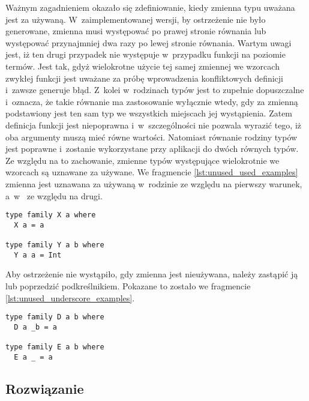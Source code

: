 Ważnym zagadnieniem okazało się zdefiniowanie, kiedy zmienna typu uważana jest
za używaną. W~zaimplementowanej wersji, by ostrzeżenie nie było generowane,
zmienna musi występować po prawej stronie równania lub występować przynajmniej
dwa razy po lewej stronie równania. Wartym uwagi jest, iż ten drugi przypadek
nie występuje w~przypadku funkcji na poziomie termów. Jest tak, gdyż wielokrotne
użycie tej samej zmiennej we wzorcach zwykłej funkcji jest uważane za
próbę wprowadzenia konfliktowych definicji i~zawsze generuje błąd.
Z~kolei w~rodzinach typów jest to zupełnie dopuszczalne i~oznacza, że takie
równanie ma zastosowanie wyłącznie wtedy, gdy za zmienną podstawiony jest ten sam
typ we wszystkich miejscach jej wystąpienia. Zatem definicja funkcji 
jest niepoprawna i~w~szczególności nie pozwala wyrazić tego, iż oba argumenty muszą mieć
równe wartości. Natomiast równanie rodziny typów  jest poprawne
i~zostanie wykorzystane przy aplikacji  do dwóch równych typów. Ze względu na to
zachowanie, zmienne typów występujące wielokrotnie we wzorcach są uznawane za używane.
We fragmencie \ref{lst:unused_used_examples} zmienna  jest uznawana za
używaną w~rodzinie  ze względu na pierwszy warunek, a~w~
ze względu na drugi.

\begin{lstlisting}[float,label={lst:unused_used_examples},
                   caption={Przykład funkcji na poziomie typów ze zmiennymi uznawanymi za wykorzystywane.}]
type family X a where
  X a = a

type family Y a b where
  Y a a = Int
\end{lstlisting}

Aby ostrzeżenie nie wystąpiło, gdy zmienna jest nieużywana, należy zastąpić ją
lub poprzedzić podkreślnikiem. Pokazane to zostało we fragmencie
\ref{lst:unused_underscore_examples}.

\begin{lstlisting}[float,label={lst:unused_underscore_examples},
                   caption={Przykład funkcji na poziomie typów ze zmiennymi zastąpionymi lub poprzedzonymi podkreślnikami.}]
type family D a b where
  D a _b = a

type family E a b where
  E a _ = a
\end{lstlisting}

\subsection{Rozwiązanie} %


